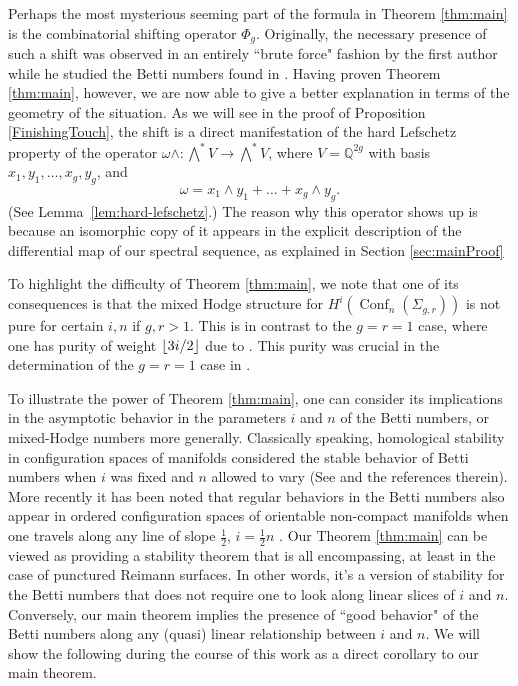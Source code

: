\documentclass[11pt,reqno]{amsproc}
\numberwithin{equation}{section}
\theoremstyle{definition}
\theoremstyle{remark}
\newcommand\Q{{\mathbb Q}}
\DeclarePairedDelimiter\floor{\lfloor}{\rfloor}
\newcommand{\YH}[1]{{{\color{blue}{#1}}}}
\DeclareMathOperator{\Conf}{Conf}
\begin{document}
Perhaps the most mysterious seeming part of the formula in Theorem \ref{thm:main} is the combinatorial shifting operator $\Phi_g$. Originally, the necessary presence of such a shift was observed in an entirely ``brute force" fashion by the first author while he studied the Betti numbers found in \cite{drummondcoleknudsen}. Having proven Theorem \ref{thm:main}, however, we are now able to give a better explanation in terms of the geometry of the situation. As we will see in the proof of Proposition \ref{FinishingTouch}, the shift is a direct manifestation of the hard Lefschetz property of the operator $\omega\wedge:\bigwedge^*V\to \bigwedge^*V$, where $V=\Q^{2g}$ with basis $x_1,y_1,\dots,x_g,y_g$, and 
\begin{equation}
    \omega=x_1\wedge y_1+\dots+x_g\wedge y_g.
\end{equation}
(See Lemma~\ref{lem:hard-lefschetz}.) The reason why this operator shows up is because an isomorphic copy of it appears in the explicit description of the differential map of our spectral sequence, as explained in Section \ref{sec:mainProof}

To highlight the difficulty of Theorem \ref{thm:main}, we note that one of its consequences is that the mixed Hodge structure for $H^i(\Conf_n(\Sigma_{g,r}))$ is not pure for certain $i,n$ if $g,r > 1$. This is in contrast to the $g=r=1$ case, where one has purity of weight $\floor{3i/2}$ due to \cite{cheonghuang2022betti}. This purity was crucial in the determination of the $g=r=1$ case in \cite{cheonghuang2022betti}.%

To illustrate the power of Theorem \ref{thm:main}, one can consider its implications in the asymptotic behavior in the parameters $i$ and $n$ of the Betti numbers, or mixed-Hodge numbers more generally. Classically speaking, homological stability in configuration spaces of manifolds considered the stable behavior of Betti numbers when $i$ was fixed and $n$ allowed to vary (See \cite{segal1973configuration}\cite{mcduff1975configuration}\cite{church2012homological} and the references therein). More recently it has been noted that regular behaviors in the Betti numbers also appear in ordered configuration spaces of orientable non-compact manifolds when one travels along any line of slope $\frac{1}{2}$, $i = \frac{1}{2}n$ \cite{miller2019higher}. Our Theorem \ref{thm:main} can be viewed as providing a stability theorem that is all encompassing, at least in the case of punctured Reimann surfaces. In other words, it's a version of stability for the Betti numbers that does not require one to look along linear slices of $i$ and $n$. Conversely, our main theorem implies the presence of ``good behavior" of the Betti numbers along any (quasi) linear relationship between $i$ and $n$. We will show the following during the course of this work as a direct corollary to our main theorem.
\end{document}

